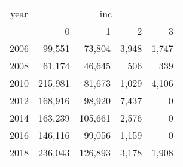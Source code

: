 \footnotesize\begin{tabular}[t]{lrrrr}
\toprule
\multicolumn{1}{c}{year} & \multicolumn{4}{c}{inc} \\
\cmidrule(l{3pt}r{3pt}){1-1} \cmidrule(l{3pt}r{3pt}){2-5}
  & 0 & 1 & 2 & 3\\
\midrule
2006 & 99,551 & 73,804 & 3,948 & 1,747\\
2008 & 61,174 & 46,645 & 506 & 339\\
2010 & 215,981 & 81,673 & 1,029 & 4,106\\
2012 & 168,916 & 98,920 & 7,437 & 0\\
2014 & 163,239 & 105,661 & 2,576 & 0\\
2016 & 146,116 & 99,056 & 1,159 & 0\\
2018 & 236,043 & 126,893 & 3,178 & 1,908\\
\bottomrule
\end{tabular}
